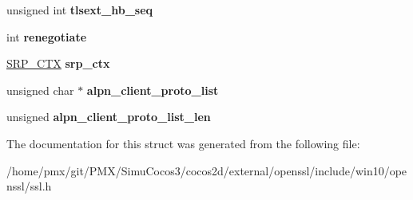\begin{DoxyCompactItemize}
\mbox{\label{structssl__st_af5db9aefebe8c45e8f063d2033b1bffd}} 
unsigned int {\bfseries tlsext\+\_\+hb\+\_\+seq}
\item 
\mbox{\label{structssl__st_a0a493dfdeb51c5c0a73107e0579e9601}} 
int {\bfseries renegotiate}
\item 
\mbox{\label{structssl__st_aaef9c47543427df406b33888d147f65d}} 
\hyperlink{structsrp__ctx__st}{S\+R\+P\+\_\+\+C\+TX} {\bfseries srp\+\_\+ctx}
\item 
\mbox{\label{structssl__st_ac34e3a88a8c4bd0397190b2a23fdfb3f}} 
unsigned char $\ast$ {\bfseries alpn\+\_\+client\+\_\+proto\+\_\+list}
\item 
\mbox{\label{structssl__st_a92b571604206f487b8e73862ef56cd47}} 
unsigned {\bfseries alpn\+\_\+client\+\_\+proto\+\_\+list\+\_\+len}
\end{DoxyCompactItemize}


The documentation for this struct was generated from the following file\+:\begin{DoxyCompactItemize}
\item 
/home/pmx/git/\+P\+M\+X/\+Simu\+Cocos3/cocos2d/external/openssl/include/win10/openssl/ssl.\+h\end{DoxyCompactItemize}
